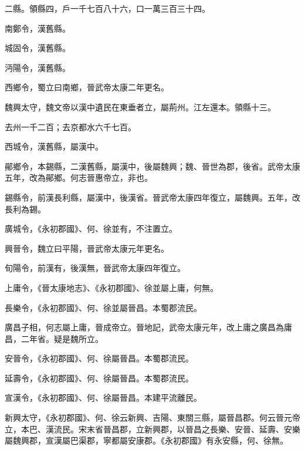 \begin{pinyinscope}
 二縣。領縣四，戶一千七百八十六，口一萬三百三十四。



 南鄭令，漢舊縣。



 城固令，漢舊縣。



 沔陽令，漢舊縣。



 西鄉令，蜀立曰南鄉，晉武帝太康二年更名。



 魏興太守，魏文帝以漢中遺民在東垂者立，屬荊州。江左還本。領縣十三。


 去州一千二百；去京都水六千七百。



 西城令，漢舊縣，屬漢中。



 鄖鄉令，本錫縣，二漢舊縣，屬漢中，後屬魏興；魏、晉世為郡，後省。武帝太康五年，改為鄖鄉。何志晉惠帝立，非也。



 錫縣令，前漢長利縣，屬漢中，後漢省。晉武帝太康四年復立，屬魏興。五年，改長利為錫。



 廣城令，《永初郡國》、何、徐並有，不注置立。



 興晉令，魏立曰平陽，晉武帝太康元年更名。



 旬陽令，前漢有，後漢無，晉武帝太康四年復立。



 上庸令，《晉太康地志》、《永初郡國》、徐並屬上庸，何無。



 長樂令，《永初郡國》、何、徐並屬晉昌。本蜀郡流民。



 廣昌子相，何志屬上庸，晉成帝立。晉地記，武帝太康元年，改上庸之廣昌為庸昌，二年省。疑是魏所立。



 安晉令，《永初郡國》、何、徐屬晉昌。本蜀郡流民。



 延壽令，《永初郡國》、何、徐屬晉昌。本蜀郡流民。



 宣漢令，《永初郡國》、何、徐屬晉昌。本建平流離民。



 新興太守，《永初郡國》、何、徐云新興、吉陽、東關三縣，屬晉昌郡。何云晉元帝立，本巴、漢流民。宋末省晉昌郡，立新興郡，以晉昌之長樂、安晉、延壽、安樂屬魏興郡，宣漢屬巴渠郡，寧都屬安康郡。《永初郡國》有永安縣，何、徐無。




\end{pinyinscope}
